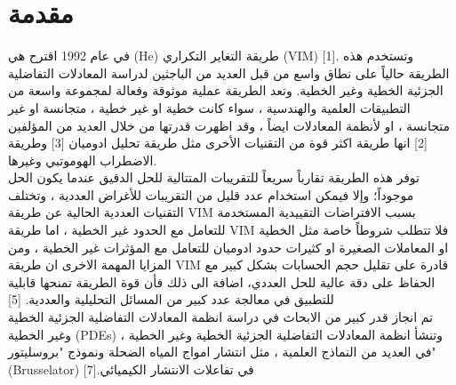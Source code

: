 \chapter*{مقدمة}

في عام 1992 اقترح هي (He) طريقة التغاير التكراري (VIM) [1]. وتستخدم هذه الطريقة حالياً على نطاق واسع من قبل العديد من الباجثين لدراسة المعادلات التفاضلية الجزئية الخطية وغير الخطية. وتعد الطريقة عملية موثوقة وفعالة لمجموعة واسعة من التطبيقات العلمية والهندسية ، سواء كانت خطية او غير خطية ، متجانسة او غير متجانسة ، او لأنظمة المعادلات ايضاً ، وقد اظهرت قدرتها من خلال العديد من المؤلفين [2] انها طريقة اكثر قوة من التقنيات الأخرى مثل طريقة تحليل ادوميان [3] وطريقة الاضطراب الهوموتبي وغيرها.\\

توفر هذه الطريقة تقارباً سريعاً للتقريبات المتتالية للحل الدقيق عندما يكون الحل موجوداً؛ وإلا فيمكن استخدام عدد قليل من التقريبات للأغراض العددية ، وتختلف التقنيات العددية الحالية عن طريقة VIM بسبب الافتراضات التقييدية المستخدمة للتعامل مع الحدود غير الخطية ، اما طريقة VIM فلا تتطلب شروطاً خاصة مثل الخطية او المعاملات الصغيرة او كثيرات حدود ادوميان للتعامل مع المؤثرات غير الخطية ، ومن المزايا المهمة الاخرى ان طريقة VIM قادرة على تقليل حجم الحسابات بشكل كبير مع الحفاظ على دقة عالية للحل العددي، اضافة الى ذلك فأن قوة الطريقة تمنحها قابلية للتطبيق في معالجة عدد كبير من المسائل التحليلية والعددية. [5]\\

تم انجاز قدر كبير من الابحاث في دراسة انظمة المعادلات التفاضلية الجزئية الخطية وغير الخطية (PDEs) ، وتنشأ انظمة المعادلات التفاضلية الجزئية الخطية وغير الخطية في العديد من النماذج العلمية ، مثل انتشار امواج المياه الضحلة ونموذج "بروسليتور" (Brusselator) في تفاعلات الانتشار الكيميائي.[7]